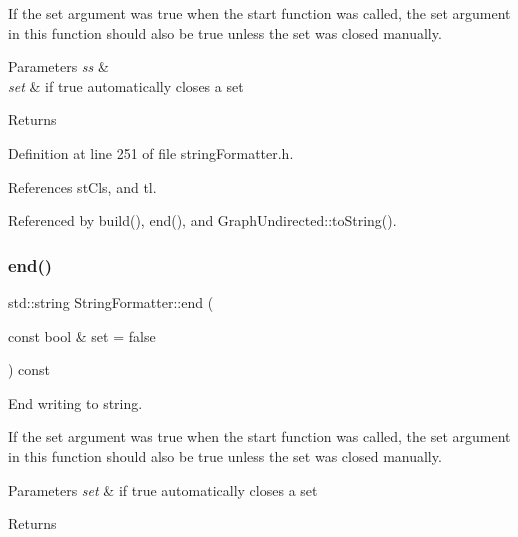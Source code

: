 If the set argument was true when the start function was called, the set argument in this function should also be true unless the set was closed manually.


\begin{DoxyParams}{Parameters}
{\em ss} & \\
\hline
{\em set} & if true automatically closes a set \\
\hline
\end{DoxyParams}
\begin{DoxyReturn}{Returns}

\end{DoxyReturn}


Definition at line 251 of file string\+Formatter.\+h.



References st\+Cls, and tl.



Referenced by build(), end(), and Graph\+Undirected\+::to\+String().

\mbox{\label{classStringFormatter_ae06dd9b27922820923fa323702f4111c}} 
\subsubsection{\texorpdfstring{end()}{end()}\hspace{0.1cm}{\footnotesize\ttfamily [2/2]}}
{\footnotesize\ttfamily std\+::string String\+Formatter\+::end (\begin{DoxyParamCaption}\item[{const bool \&}]{set = {\ttfamily false} }\end{DoxyParamCaption}) const\hspace{0.3cm}{\ttfamily [inline]}}



End writing to string. 

If the set argument was true when the start function was called, the set argument in this function should also be true unless the set was closed manually.


\begin{DoxyParams}{Parameters}
{\em set} & if true automatically closes a set \\
\hline
\end{DoxyParams}
\begin{DoxyReturn}{Returns}

\end{DoxyReturn}



